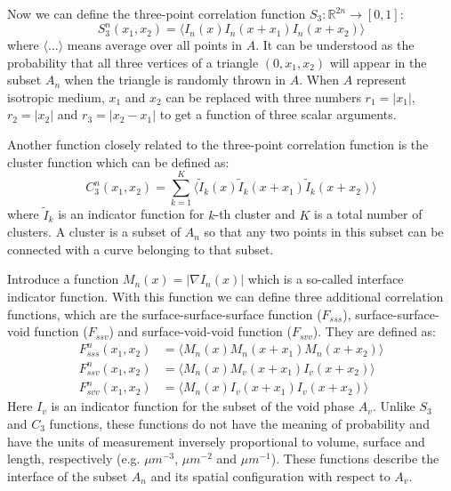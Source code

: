 \documentclass[reprint,amsmath,amssymb,aps,pre,showkeys,showpacs]{revtex4-1}
\begin{document}
Now we can define the three-point correlation function
$S_3: \mathbb{R}^{2n} \rightarrow [0, 1]$:
\begin{equation}
  S_3^n(x_1, x_2) = \langle I_n(x) I_n(x + x_1) I_n(x + x_2) \rangle
\end{equation}
where $\langle \dots \rangle$ means average over all points in $A$. It can be
understood as the probability that all three vertices of a triangle
$(0, x_1, x_2)$ will appear in the subset $A_n$ when the triangle is randomly
thrown in $A$. When $A$ represent isotropic medium, $x_1$ and $x_2$ can be
replaced with three numbers $r_1 = |x_1|$, $r_2 = |x_2|$ and $r_3 = |x_2 - x_1|$
to get a function of three scalar arguments.

Another function closely related to the three-point correlation function is the
cluster function which can be defined as:
\begin{equation}
  C_3^n(x_1, x_2) = \sum_{k=1}^K \langle \tilde{I}_k(x) \tilde{I}_k(x + x_1)
  \tilde{I}_k(x + x_2) \rangle
\end{equation}
where $\tilde{I}_k$ is an indicator function for $k$-th cluster and $K$ is a
total number of clusters. A cluster is a subset of $A_n$ so that any two points
in this subset can be connected with a curve belonging to that subset.

Introduce a function $M_n(x) = |\nabla I_n(x)|$ which is a so-called interface
indicator function. With this function we can define three additional
correlation functions, which are the surface-surface-surface function
($F_{sss}$), surface-surface-void function ($F_{ssv}$) and surface-void-void
function ($F_{svv}$). They are defined as:
\begin{align}
  F_{sss}^n(x_1, x_2) &= \langle M_n(x) M_n(x + x_1) M_n(x + x_2) \rangle \\
  F_{ssv}^n(x_1, x_2) &= \langle M_n(x) M_v(x + x_1) I_v(x + x_2) \rangle \\
  F_{svv}^n(x_1, x_2) &= \langle M_n(x) I_v(x + x_1) I_v(x + x_2) \rangle
\end{align}
Here $I_v$ is an indicator function for the subset of the void phase
$A_v$. Unlike $S_3$ and $C_3$ functions, these functions do not have the meaning
of probability and have the units of measurement inversely proportional to
volume, surface and length, respectively (e.g. $\mu m^{-3}$, $\mu m^{-2}$ and
$\mu m^{-1}$). These functions describe the interface of the subset $A_n$ and
its spatial configuration with respect to $A_v$.
\end{document}
